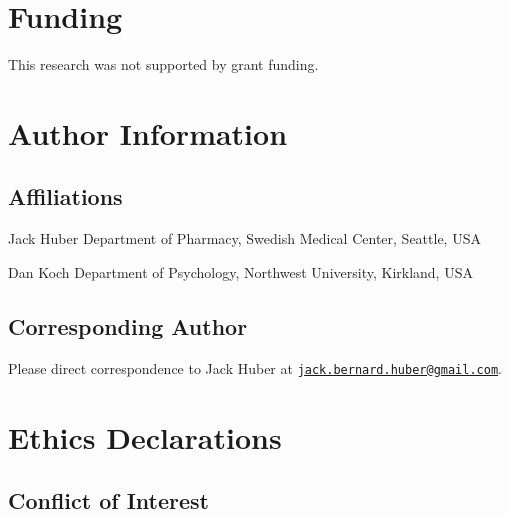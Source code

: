 \documentclass[
  letterpaper,
]{article}
\begin{document}
\chapter*{Funding}\label{funding}


This research was not supported by grant funding.


\chapter*{Author Information}\label{author-information}


\section*{Affiliations}\label{affiliations}


Jack Huber Department of Pharmacy, Swedish Medical Center, Seattle, USA

Dan Koch Department of Psychology, Northwest University, Kirkland, USA

\section*{Corresponding Author}\label{corresponding-author}


Please direct correspondence to Jack Huber at
\href{mailto:jack.bernard.huber@gmail.com}{\nolinkurl{jack.bernard.huber@gmail.com}}.


\chapter*{Ethics Declarations}\label{ethics-declarations}


\section*{Conflict of Interest}\label{conflict-of-interest}
\end{document}
